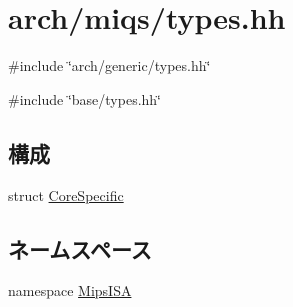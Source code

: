 \hypertarget{arch_2miqs_2types_8hh}{
\section{arch/miqs/types.hh}
\label{arch_2miqs_2types_8hh}
}
{\ttfamily \#include \char`\"{}arch/generic/types.hh\char`\"{}}\par
{\ttfamily \#include \char`\"{}base/types.hh\char`\"{}}\par
\subsection*{構成}
\begin{DoxyCompactItemize}
\item 
struct \hyperlink{structMipsISA_1_1CoreSpecific}{CoreSpecific}
\end{DoxyCompactItemize}
\subsection*{ネームスペース}
\begin{DoxyCompactItemize}
\item 
namespace \hyperlink{namespaceMipsISA}{MipsISA}
\end{DoxyCompactItemize}
